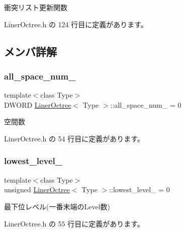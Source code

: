 衝突リスト更新関数 



 Liner\+Octree.\+h の 124 行目に定義があります。



\subsection{メンバ詳解}
\mbox{\label{class_liner_octree_aff1d6fcdf606bb2e42461714c0e7aa50}} 
\subsubsection{\texorpdfstring{all\+\_\+space\+\_\+num\+\_\+}{all\_space\_num\_}}
{\footnotesize\ttfamily template$<$class Type$>$ \\
D\+W\+O\+RD \mbox{\hyperlink{class_liner_octree}{Liner\+Octree}}$<$ Type $>$\+::all\+\_\+space\+\_\+num\+\_\+ = 0\hspace{0.3cm}{\ttfamily [private]}}



空間数 



 Liner\+Octree.\+h の 54 行目に定義があります。

\mbox{\label{class_liner_octree_aa62a6ad34ceed4a8fef93123ca45350d}} 
\subsubsection{\texorpdfstring{lowest\+\_\+level\+\_\+}{lowest\_level\_}}
{\footnotesize\ttfamily template$<$class Type$>$ \\
unsigned \mbox{\hyperlink{class_liner_octree}{Liner\+Octree}}$<$ Type $>$\+::lowest\+\_\+level\+\_\+ = 0\hspace{0.3cm}{\ttfamily [private]}}



最下位レベル(一番末端の\+Level数) 



 Liner\+Octree.\+h の 55 行目に定義があります。

